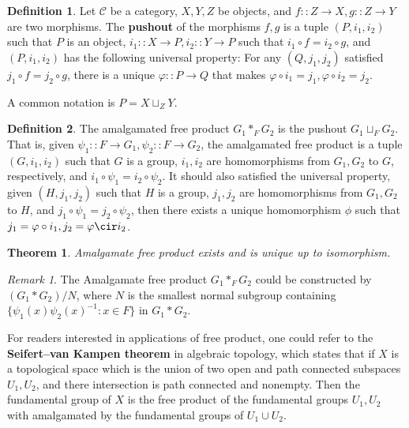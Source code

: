 \documentclass[a4paper,titlepage]{article}
\newtheorem{theorem}{Theorem}
\theoremstyle{remark}
\newtheorem*{remark}{Remark}
\theoremstyle{definition}
\theoremstyle{definition}
\newtheorem{definition}{Definition}
\theoremstyle{plain}
\begin{document}
  \begin{definition}
    Let $\mathcal{C}$ be a category, $X, Y, Z$ be objects, and $f :: Z \to X, g :: Z \to Y$ are
    two morphisms. The {\bf pushout} of the morphisms $f, g$ is a tuple $(P, i_1, i_2)$ such
    that $P$ is an object, $i_1 :: X \to P, i_2 :: Y \to P$ such that $i_1 \circ f = i_2 \circ g$,
    and $(P, i_1, i_2)$ has the following universal property: 
    For any $(Q, j_1, j_2)$ satisfied $j_1 \circ f = j_2 \circ g$, there is a unique $\varphi :: P \to Q$
    that makes $\varphi \circ i_1 = j_1, \varphi \circ i_2 = j_2$.
    
    A common notation is $P = X \sqcup_{Z} Y$.
  \end{definition}

  \begin{definition}
    The amalgamated free product $G_1 \ast_F G_2$ is the pushout $G_1 \sqcup_{F} G_2$. That
    is, given $\psi_1 :: F \to G_1, \psi_2 :: F \to G_2$, the amalgamated free product is a tuple
    $(G, i_1, i_2)$ such that $G$ is a group, $i_1, i_2$ are homomorphisms from $G_1, G_2$ to
    $G$, respectively, and $i_1 \circ \psi_1 = i_2 \circ \psi_2$. It should also satisfied
    the universal property, given $(H, j_1, j_2)$ such that $H$ is a group,
    $j_1, j_2$ are homomorphisms from $G_1, G_2$ to
    $H$, and $j_1 \circ \psi_1 = j_2 \circ \psi_2$, then there exists a unique homomorphism
    $\phi$ such that $j_1 = \varphi \circ i_1, j_2 = \varphi \cir i_2$.
  \end{definition}

  \begin{theorem}
    Amalgamate free product exists and is unique up to isomorphism.
  \end{theorem}

  \begin{remark}
    The Amalgamate free product $G_1 \ast_F G_2$ could be constructed by
    $(G_1 \ast G_2) / N$, where $N$ is the smallest normal subgroup containing
    $\{ \psi_1(x) \psi_2(x)^{-1} : x \in F \}$ in $G_1 \ast G_2$.
  \end{remark}

  For readers interested in applications of free product, one could refer to the
  {\bf Seifert–van Kampen theorem} in algebraic topology, which states that if $X$ is 
  a topological space which is the union of two open and path connected subspaces $U_1, U_2$,
  and there intersection is path connected and nonempty. Then the fundamental group
  of $X$ is the free product of the fundamental groups $U_1, U_2$ with amalgamated by
  the fundamental groups of $U_1 \cup U_2$.
\end{document}
